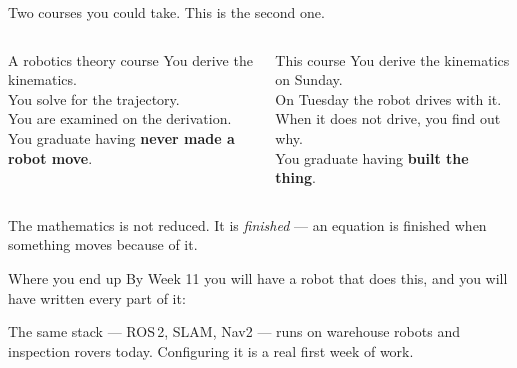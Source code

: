 \documentclass[aspectratio=169]{beamer}
\begin{document}
\begin{frame}{Two courses you could take. This is the second one.}
  \begin{columns}[T,onlytextwidth]
    \begin{block}{\small A robotics theory course}
      \footnotesize
      You derive the kinematics.\\
      You solve for the trajectory.\\
      You are examined on the derivation.\\[0.4em]
      You graduate having \textbf{never made a robot move}.
    \end{block}

    \begin{block}{\small This course}
      \footnotesize
      You derive the kinematics on Sunday.\\
      On Tuesday the robot drives with it.\\
      When it does not drive, you find out why.\\[0.4em]
      You graduate having \textbf{built the thing}.
    \end{block}
  \end{columns}

  \vspace{0.8em}
  The mathematics is not reduced. It is \emph{finished} --- an equation is finished when
  something moves because of it.
\end{frame}

\begin{frame}{Where you end up}
  \small By Week 11 you will have a robot that does this, and you will have written
  every part of it:

  \begin{center}
  \end{center}

  \begin{inthefield}
    \footnotesize The same stack --- ROS\,2, SLAM, Nav2 --- runs on warehouse robots and
    inspection rovers today. Configuring it is a real first week of work.
  \end{inthefield}
\end{frame}
\end{document}
